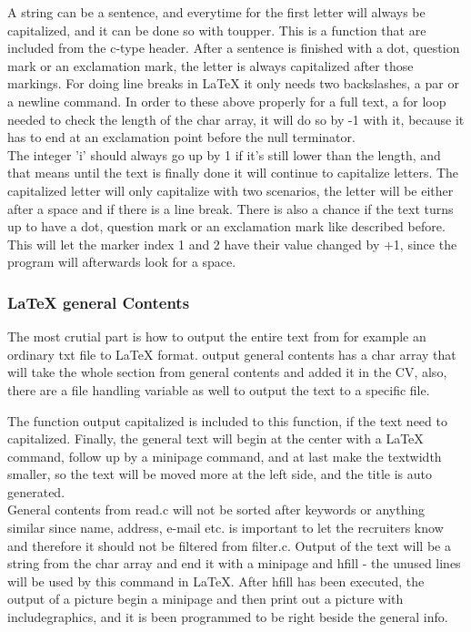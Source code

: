 A string can be a sentence, and everytime for the first letter will always be capitalized,
and it can be done so with toupper.
This is a function that are included from the c-type header.
After a sentence is finished with a dot, question mark or an exclamation mark, 
the letter is always capitalized after those markings.
For doing line breaks in LaTeX it only needs two backslashes, a par or a newline command. 
In order to these above properly for a full text, a for loop needed to check the length of the char array,
it will do so by -1 with it, because it has to end at an exclamation point before the null terminator.\\

The integer 'i' should always go up by 1 if it's still lower than the length, 
and that means until the text is finally done 
it will continue to capitalize letters. The capitalized letter will only capitalize with two scenarios, 
the letter will be either after a space and if there is a line break.
There is also a chance if the text turns up to have a dot, question mark or an exclamation mark like described before.
This will let the marker index 1 and 2 have their value changed by +1, since the program will afterwards look for a space.\\

\subsubsection{LaTeX general Contents}
The most crutial part is how to output the entire text from for example an ordinary txt file to LaTeX format.
output general contents has a char array that will take the whole section from general contents and added it in the CV,
also, there are a file handling variable as well to output the text to a specific file. 

The function output capitalized is included to this function, if the text need to capitalized.
Finally, the general text will begin at the center with a LaTeX command, follow up by a minipage command, 
and at last make the textwidth smaller, so the text will be moved more at the left side, and the title is auto generated. \\

General contents from read.c will not be sorted after keywords or anything similar 
since name, address, e-mail etc. is important to let the recruiters know and therefore it should not be filtered from filter.c.
Output of the text will be a string from the char array 
and end it with a minipage and hfill - the unused lines will be used by this command in LaTeX.
After hfill has been executed, the output of a picture begin a minipage 
and then print out a picture with includegraphics, and it is been programmed to be right beside the general info. 

